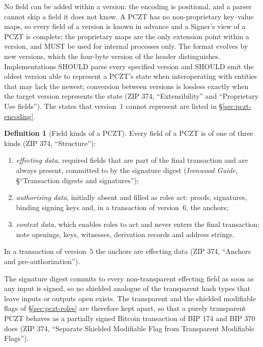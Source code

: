 \documentclass[11pt,a4paper]{article}
\theoremstyle{definition}
\newtheorem{definition}[theorem]{Definition}
\begin{document}
No field can be added within a version: the encoding is positional, and a
parser cannot skip a field it does not know. A PCZT has no non-proprietary
key--value maps, so every field of a version is known in advance and a
Signer's view of a PCZT is complete; the proprietary maps are the only
extension point within a version, and MUST be used for internal processes
only. The format evolves by new versions, which the four-byte version of
the header distinguishes. Implementations SHOULD parse every specified
version and SHOULD emit the oldest version able to represent a PCZT's state
when interoperating with entities that may lack the newest; conversion
between versions is lossless exactly when the target version represents the
state (ZIP 374, ``Extensibility'' and ``Proprietary Use fields''). The
states that version~$1$ cannot represent are listed in
\S\ref{sec:pczt-encoding}.

\begin{definition}[Field kinds of a PCZT]\label{def:pczt-kinds}
Every field of a PCZT is of one of three kinds (ZIP 374, ``Structure''):
\begin{enumerate}[label=(\roman*)]
\item \emph{effecting data}, required fields that are part of the final
  transaction and are always present, committed to by the signature digest
  (\emph{Ironwood Guide}, \S``Transaction digests and signatures'');
\item \emph{authorising data}, initially absent and filled as roles act:
  proofs, signatures, binding signing keys and, in a transaction of
  version~$6$, the anchors;
\item \emph{context data}, which enables roles to act and never enters the
  final transaction: note openings, keys, witnesses, derivation records and
  address strings.
\end{enumerate}
In a transaction of version~$5$ the anchors are effecting data (ZIP 374,
``Anchors and pre-authorization'').
\end{definition}

The signature digest commits to every non-transparent effecting field as
soon as any input is signed, so no shielded analogue of the transparent
hash types that leave inputs or outputs open exists. The transparent and
the shielded modifiable flags of \S\ref{sec:pczt-roles} are therefore kept
apart, so that a purely transparent PCZT behaves as a partially signed
Bitcoin transaction of BIP 174 and BIP 370 does (ZIP 374, ``Separate
Shielded Modifiable Flag from Transparent Modifiable Flags'').
\end{document}
